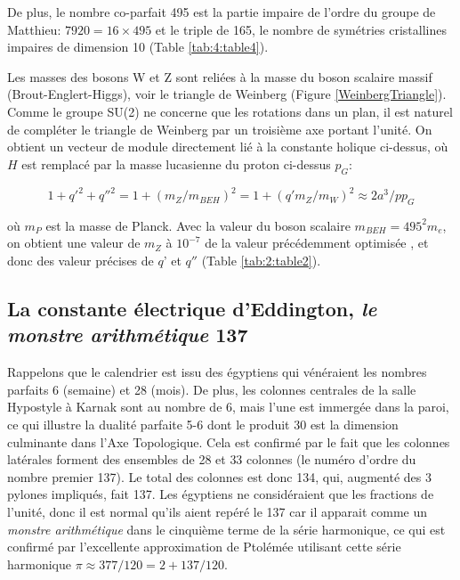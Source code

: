 \documentclass[a4paper,9pt]{article}
\newcounter{col}
\begin{document}
De plus, le nombre co-parfait 495 est la partie impaire de l'ordre du groupe de Matthieu: $7920 = 16 \times 495$ et le triple de 165, le nombre de symétries cristallines impaires de dimension 10 (Table \ref{tab:4:table4}).

Les masses des bosons W et Z sont reliées à la masse du boson scalaire massif (Brout-Englert-Higgs), voir le triangle de Weinberg (Figure \ref{WeinbergTriangle}). Comme le groupe SU(2) ne concerne que les rotations dans un plan, il est naturel de compléter le triangle de Weinberg par un troisième axe portant l'unité. On obtient un vecteur de module directement lié à la constante holique ci-dessus, où $H$ est remplacé par la masse lucasienne du proton ci-dessus $p_G$:

\begin{equation}
 1 + {q'}^2  + {q''}^2 = 1 + (m_Z/m_{BEH})^2 = 1 + (q'm_Z/m_W)^2\approx 2a^3/pp_G 
 \end{equation}
 
où $m_P$ est la masse de Planck. Avec la valeur du boson scalaire $ m_{BEH} = 495^2 m_e $, on obtient une valeur de $m_Z$ à $10^{-7}$ de la valeur précédemment optimisée  \cite{Sanchez2}, et donc des valeur précises de $q$' et $q''$ (Table \ref{tab:2:table2}). 



\subsection{La constante électrique d’Eddington, \textit{le monstre arithmétique} 137}

Rappelons que le calendrier est issu des égyptiens qui vénéraient les nombres parfaits 6 (semaine) et 28 (mois). De plus, les colonnes centrales de la salle Hypostyle à Karnak sont au nombre de 6, mais l'une est immergée dans la paroi, ce qui illustre la dualité parfaite 5-6 dont le produit 30 est la dimension culminante dans l'Axe Topologique. Cela est confirmé par le fait que les colonnes latérales forment des ensembles de 28 et 33 colonnes (le numéro d'ordre du nombre premier 137). Le total des colonnes est donc 134, qui, augmenté des 3 pylones impliqués, fait 137. Les égyptiens ne considéraient que les fractions de l'unité, donc il est normal qu'ils aient repéré le 137 car il apparait comme un \textit{monstre arithmétique} dans le cinquième terme de la série harmonique, ce qui est confirmé par l'excellente approximation de Ptolémée utilisant cette série harmonique $\pi \approx 377/120 = 2 + 137/120$.
\end{document}
